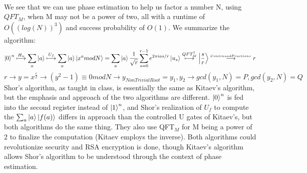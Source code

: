\documentclass[11pt]{journal}
\begin{document}
\\\indent We see that we can use phase estimation to help us factor a number N, using $QFT_M$, when M may not be a power of two, all with a runtime of $O((log(N))^3)$ and success probability of $O(1)$. We summarize the algorithm:
    \[\ket{0}^n \overset{H_n}{\longmapsto}\sum_a\ket{a}\overset{U_f}{\longmapsto}\sum_a\ket{a}\ket{x^a mod N}=\sum_a\ket{a}\frac{1}{\sqrt{r}} \sum_{s=0}^{r-1} e^{2\pi i as/r} \ket{u_s}\overset{QFT_M^{\dagger}}{\longmapsto}\ket{\frac{s}{r}}\overset{_{Continued Fractions}}{\longrightarrow} r\]\[
    r \longrightarrow y = x^{\frac{r}{2}} \longrightarrow (y^2 - 1) \equiv 0 mod N \longrightarrow y_{Non TrivialRoot} = y_1, y_2 \longrightarrow gcd(y_1, N) = P, gcd(y_2,N) = Q\]
Shor's algorithm, as taught in class, is essentially the same as Kitaev's algorithm, but the emphasis and approach of the two algorithms are different. $\ket{0}^n$ is fed into the second register instead of $\ket{1}^n$, and Shor's realization of $U_f$ to compute the $\sum_a \ket{a}\ket{f(a)}$ differs in approach than the controlled U gates of Kitaev's, but both algorithms do the same thing. They also use QFT$_M$ for M being a power of 2 to finalize the computation (Kitaev employs the inverse). Both algorithms could revolutionize security and RSA encryption is done, though Kitaev's algorithm allows Shor's algorithm to be understood through the context of phase estimation. 
\end{document}
